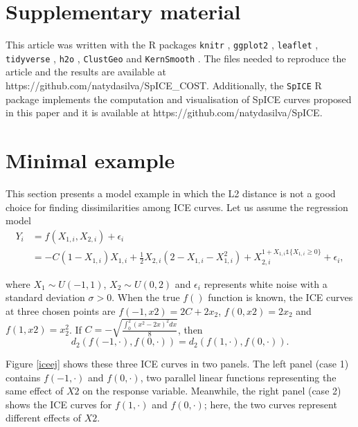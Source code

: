 \documentclass[smallextended,natbib]{svjour3}\usepackage[]{graphicx}\usepackage[]{xcolor}
\begin{document}
\section{ Supplementary material }
This article was written with the R packages \texttt{knitr} \citep{knitr}, \texttt{ggplot2} \citep{hadley:2016}, \texttt{leaflet} \citep{leaflet}, \texttt{tidyverse} \citep{tidyverse}, \texttt{h2o} \citep{h2o}, \texttt{ClustGeo} \citep{clustGeo} and
 \texttt{KernSmooth} \citep{KernSmooth}. The files needed to reproduce the article and the results are available at https://github.com/natydasilva/SpICE\_COST. Additionally, the \texttt{SpICE} R package implements the computation and visualisation of SpICE curves proposed in this paper and  it is available at  https://github.com/natydasilva/SpICE. 





\renewcommand{\refname}{References }




\appendix

\section{Minimal example \label{toyexample}}  
This section presents a model example in which the L2 distance is not a good choice for finding dissimilarities among ICE curves. Let us assume the regression model 
\[\begin{array}{cl}
  Y_i   &  = f(X_{1,i}, X_{2,i}) + \epsilon_i  \\
     & = -C(1-X_{1,i})X_{1,i} + \frac{1}{2}X_{2,i}(2- X_{1,i}-X^2_{1,i}) +X_{2,i}^{1+X_{1,i} \mathds{1}{ \{X_{1,i}\geq 0\} } }  + \epsilon_i,
\end{array}\]

where $X_1 \sim U(-1,1)$, $X_2\sim U(0,2)$ and $\epsilon_i$ represents white noise with a standard deviation $\sigma>0$. When the true $f()$ function is known, the ICE curves at three chosen points are $f(-1,x2)= 2C+2x_2$, $f(0,x2)=2x_2$ and $f(1,x2)=x_2^2$. If $C= -\sqrt{ \frac{\int_0^2(x^2-2x)^2 dx}{8}}$, then 
$$d_2\left( f(-1,\cdot), f(0,\cdot)\right)= d_2\left( f(1,\cdot), f(0,\cdot)\right).$$

Figure \ref{iceej} shows these three ICE curves in two panels. The left panel (case 1) contains $f(-1,\cdot)$ and $f(0,\cdot)$, two parallel linear functions representing the same effect of $X2$ on the response variable. Meanwhile, the right panel (case 2) shows the ICE curves for $f(1,\cdot)$ and $f(0,\cdot)$; here, the two curves represent different effects of $X2$. 
\end{document}

